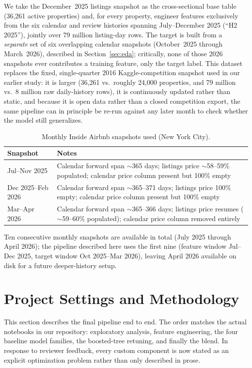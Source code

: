 \documentclass[journal]{IEEEtran}
\begin{document}
We take the December~2025 listings snapshot as the cross-sectional base table
(36{,}261 active properties) and, for every property, engineer features
exclusively from the six calendar and review histories spanning July--December
2025 (``H2 2025''), jointly over 79 million listing-day rows. The target is
built from a \emph{separate} set of six overlapping calendar snapshots
(October~2025 through March~2026), described in
Section~\ref{sec:eda}; critically, none of those 2026 snapshots
ever contributes a training feature, only the target label. This dataset
replaces the fixed, single-quarter 2016 Kaggle-competition snapshot used in our
earlier study: it is larger (36{,}261 vs.\ roughly 24{,}000 properties, and 79
million vs.\ 8 million raw daily-history rows), it is continuously updated
rather than static, and because it is open data rather than a closed
competition export, the same pipeline can in principle be re-run against any
later month to check whether the model still generalizes.

\begin{table}[!t]
\caption{Monthly Inside Airbnb snapshots used (New York City).}
\label{tab:snapshots}
\centering
\begin{tabular}{lp{5cm}}
\toprule
Snapshot & Notes \\
\midrule
Jul--Nov 2025 & Calendar forward span $\sim$365 days; listings price $\sim$58--59\% populated; calendar price column present but 100\% empty \\
Dec 2025--Feb 2026 & Calendar forward span $\sim$365--371 days; listings price 100\% empty; calendar price column present but 100\% empty \\
Mar--Apr 2026 & Calendar forward span $\sim$365--366 days; listings price resumes ($\sim$59--60\% populated); calendar price column removed entirely \\
\bottomrule
\end{tabular}
\end{table}

Ten consecutive monthly snapshots are available in total (July 2025 through
April 2026); the pipeline described here uses the first nine (feature window
Jul--Dec 2025, target window Oct 2025--Mar 2026), leaving April 2026 available
on disk for a future deeper-history setup.

\section{Project Settings and Methodology}
\label{sec:method}
This section describes the final pipeline end to end. The order matches the
actual notebooks in our repository: exploratory analysis, feature engineering,
the four baseline model families, the boosted-tree retuning, and finally the
blend. In response to reviewer feedback, every custom component is now stated as
an explicit optimization problem rather than only described in prose.
\end{document}
